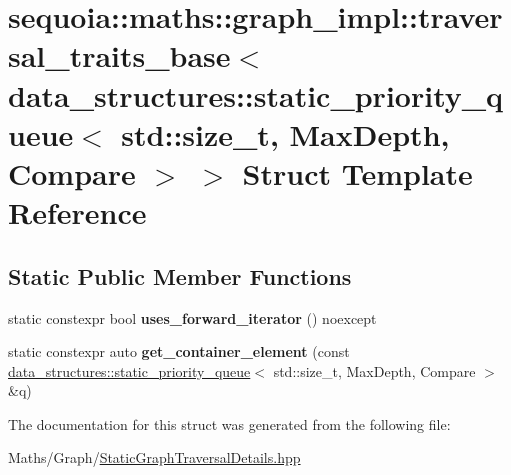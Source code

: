 \hypertarget{structsequoia_1_1maths_1_1graph__impl_1_1traversal__traits__base_3_01data__structures_1_1static_a741db87b41025331b682896a3cb2cf4}{}\section{sequoia\+::maths\+::graph\+\_\+impl\+::traversal\+\_\+traits\+\_\+base$<$ data\+\_\+structures\+::static\+\_\+priority\+\_\+queue$<$ std\+::size\+\_\+t, Max\+Depth, Compare $>$ $>$ Struct Template Reference}
\label{structsequoia_1_1maths_1_1graph__impl_1_1traversal__traits__base_3_01data__structures_1_1static_a741db87b41025331b682896a3cb2cf4}
\subsection*{Static Public Member Functions}
\begin{DoxyCompactItemize}
\item 
\mbox{\label{structsequoia_1_1maths_1_1graph__impl_1_1traversal__traits__base_3_01data__structures_1_1static_a741db87b41025331b682896a3cb2cf4_a3b76928cbd2f7ec357bda30fd2c9683f}} 
static constexpr bool {\bfseries uses\+\_\+forward\+\_\+iterator} () noexcept
\item 
\mbox{\label{structsequoia_1_1maths_1_1graph__impl_1_1traversal__traits__base_3_01data__structures_1_1static_a741db87b41025331b682896a3cb2cf4_a1a51196e3a7e987f6c1d3137d5c5e422}} 
static constexpr auto {\bfseries get\+\_\+container\+\_\+element} (const \mbox{\hyperlink{classsequoia_1_1data__structures_1_1static__priority__queue}{data\+\_\+structures\+::static\+\_\+priority\+\_\+queue}}$<$ std\+::size\+\_\+t, Max\+Depth, Compare $>$ \&q)
\end{DoxyCompactItemize}


The documentation for this struct was generated from the following file\+:\begin{DoxyCompactItemize}
\item 
Maths/\+Graph/\mbox{\hyperlink{_static_graph_traversal_details_8hpp}{Static\+Graph\+Traversal\+Details.\+hpp}}\end{DoxyCompactItemize}
